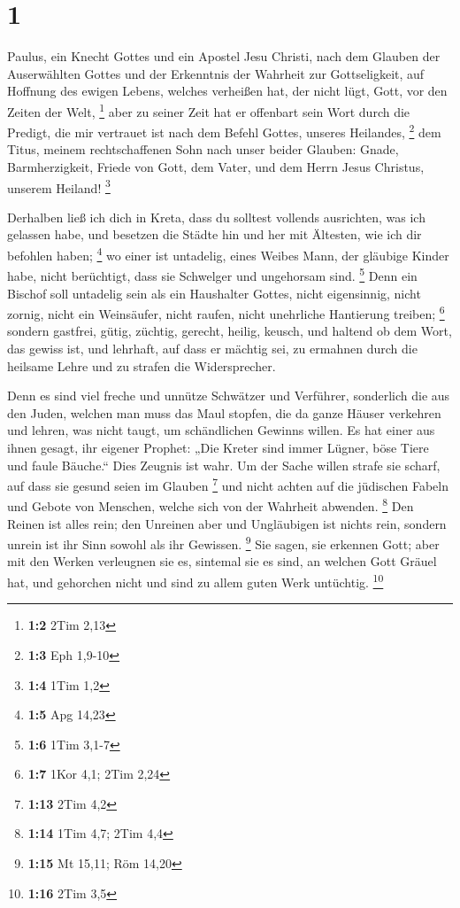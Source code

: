 \hypertarget{section}{%
\section{1}\label{section}}

 Paulus, ein Knecht Gottes und ein Apostel Jesu Christi,
nach dem Glauben der Auserwählten Gottes und der Erkenntnis der Wahrheit
zur Gottseligkeit,  auf Hoffnung des ewigen Lebens, welches
verheißen hat, der nicht lügt, Gott, vor den Zeiten der Welt,
\footnote{\textbf{1:2} 2Tim 2,13}  aber zu seiner Zeit hat
er offenbart sein Wort durch die Predigt, die mir vertrauet ist nach dem
Befehl Gottes, unseres Heilandes, \footnote{\textbf{1:3} Eph 1,9-10}
 dem Titus, meinem rechtschaffenen Sohn nach unser beider
Glauben: Gnade, Barmherzigkeit, Friede von Gott, dem Vater, und dem
Herrn Jesus Christus, unserem Heiland! \footnote{\textbf{1:4} 1Tim 1,2}

 Derhalben ließ ich dich in Kreta, dass du solltest vollends
ausrichten, was ich gelassen habe, und besetzen die Städte hin und her
mit Ältesten, wie ich dir befohlen haben; \footnote{\textbf{1:5} Apg
  14,23}  wo einer ist untadelig, eines Weibes Mann, der
gläubige Kinder habe, nicht berüchtigt, dass sie Schwelger und
ungehorsam sind. \footnote{\textbf{1:6} 1Tim 3,1-7}  Denn
ein Bischof soll untadelig sein als ein Haushalter Gottes, nicht
eigensinnig, nicht zornig, nicht ein Weinsäufer, nicht raufen, nicht
unehrliche Hantierung treiben; \footnote{\textbf{1:7} 1Kor 4,1; 2Tim
  2,24}  sondern gastfrei, gütig, züchtig, gerecht, heilig,
keusch,  und haltend ob dem Wort, das gewiss ist, und
lehrhaft, auf dass er mächtig sei, zu ermahnen durch die heilsame Lehre
und zu strafen die Widersprecher.

 Denn es sind viel freche und unnütze Schwätzer und
Verführer, sonderlich die aus den Juden,  welchen man muss
das Maul stopfen, die da ganze Häuser verkehren und lehren, was nicht
taugt, um schändlichen Gewinns willen.  Es hat einer aus
ihnen gesagt, ihr eigener Prophet: „Die Kreter sind immer Lügner, böse
Tiere und faule Bäuche.``  Dies Zeugnis ist wahr. Um der
Sache willen strafe sie scharf, auf dass sie gesund seien im Glauben
\footnote{\textbf{1:13} 2Tim 4,2}  und nicht achten auf die
jüdischen Fabeln und Gebote von Menschen, welche sich von der Wahrheit
abwenden. \footnote{\textbf{1:14} 1Tim 4,7; 2Tim 4,4}  Den
Reinen ist alles rein; den Unreinen aber und Ungläubigen ist nichts
rein, sondern unrein ist ihr Sinn sowohl als ihr Gewissen. \footnote{\textbf{1:15}
  Mt 15,11; Röm 14,20}  Sie sagen, sie erkennen Gott; aber
mit den Werken verleugnen sie es, sintemal sie es sind, an welchen Gott
Gräuel hat, und gehorchen nicht und sind zu allem guten Werk untüchtig.
\footnote{\textbf{1:16} 2Tim 3,5}


